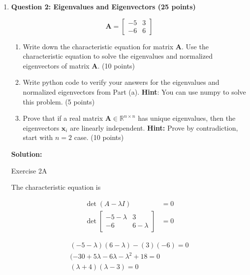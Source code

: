 \documentclass[11pt,letterpaper]{article}
\begin{document}
\begin{enumerate}
\begin{lstlisting}
svd_e: SVDResult(U=array([[-0.61541221, -0.78820544],
       [-0.78820544,  0.61541221]]), S=array([4.56155281, 0.43844719]), Vh=array([[-0.78820544, -0.61541221],
       [ 0.61541221, -0.78820544]]))
\end{lstlisting}

\clearpage
\item[] \textbf{Question 2: Eigenvalues and Eigenvectors (25 points)}

\begin{equation*}
    \mathbf{A} 
    = \begin{bmatrix}
        -5   & 3\\
        -6   & 6
    \end{bmatrix}
\end{equation*}

\begin{enumerate}[label=(\alph*)]
    \item Write down the characteristic equation for matrix $\mathbf{A}$. Use the characteristic equation to solve the eigenvalues and normalized eigenvectors of matrix $\mathbf{A}$. (10 points)
    \item Write python code to verify your answers for the eigenvalues and normalized eigenvectors from Part (a). \textbf{Hint}: You can use numpy to solve this problem. (5 points)
    
    \item Prove that if a real matrix $\mathbf{A} \in \mathbb{R}^{n \times n}$ has unique eigenvalues, then the eigenvectors $\mathbf{x}_i$ are linearly independent. \textbf{Hint:} Prove by contradiction, start with $n=2$ case. (10 points)\\
\end{enumerate}

\textbf{Solution:}

\noindent\dotfill Exercise 2A \noindent\dotfill

The characteristic equation is

\begin{align*}
\det{(A - \lambda I)} &= 0 \\
\det{\begin{bmatrix}
        -5-\lambda & 3 \\
        -6 & 6-\lambda
    \end{bmatrix}} &= 0
\end{align*}

\begin{align*}
(-5 - \lambda)(6 - \lambda)-(3)(-6) = 0 \\
(-30 + 5\lambda - 6\lambda - \lambda^2 + 18 = 0 \\
(\lambda + 4)(\lambda - 3) = 0
\end{align*}


\end{enumerate}
\end{document}
